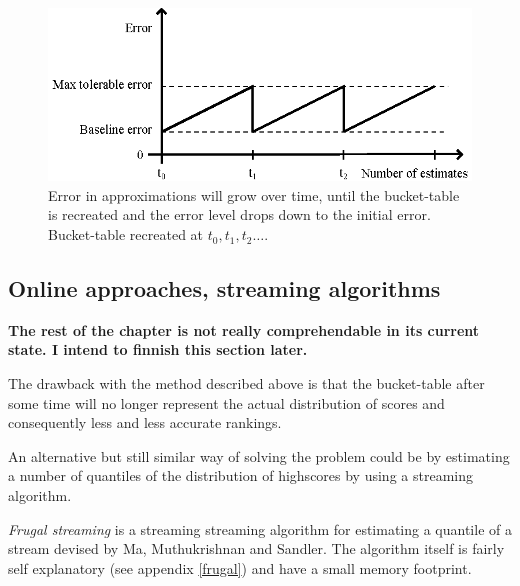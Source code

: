 \begin{figure}[h]
  \centering
  \caption{Error in approximations will grow over time, until the bucket-table is recreated and the error level drops down to the initial error. Bucket-table recreated at $t_0, t_1, t_2 \dots$. 
  }
  \label{fig:errortime}
  \includegraphics[width=13cm]{img/error-over-time.eps}
\end{figure}


\subsection{\label{frugal}Online approaches, streaming algorithms}

\todo{}

\iffalse

\begin{mdframed}[backgroundcolor=red,innerleftmargin=15pt,leftmargin=-10pt,rightmargin=-10pt, innerrightmargin=15pt,innertopmargin=10pt,innerbottommargin=10pt, fontcolor=white, skipabove=20pt, linewidth=0]
  
  \textbf{The rest of the chapter is not really comprehendable in its current state. I intend to finnish this section later.}
  
\end{mdframed}

The drawback with the method described above is that the bucket-table after some time will no longer represent the actual distribution of scores and consequently less and less accurate rankings.

An alternative but still similar way of solving the problem could be by estimating a number of quantiles of the distribution of highscores by using a streaming algorithm. 

\emph{Frugal streaming} is a streaming streaming algorithm for estimating a quantile of a stream devised by Ma, Muthukrishnan and Sandler. \cite{frugal_streaming} The algorithm itself is fairly self explanatory (see appendix \ref{frugal}) and have a small memory footprint.

